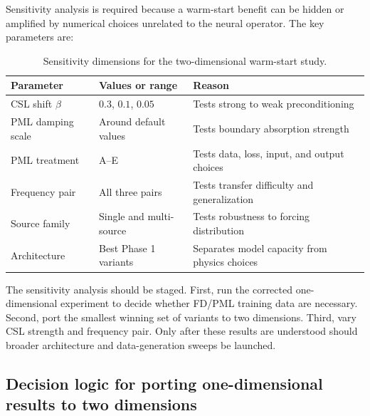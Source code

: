Sensitivity analysis is required because a warm-start benefit can be hidden or
amplified by numerical choices unrelated to the neural operator. The key
parameters are:
\begin{table}[h]
\centering
\begin{tabular}{lll}
\toprule
Parameter & Values or range & Reason \\
\midrule
CSL shift $\beta$ & $0.3$, $0.1$, $0.05$ & Tests strong to weak preconditioning \\
PML damping scale & Around default values & Tests boundary absorption strength \\
PML treatment & A--E & Tests data, loss, input, and output choices \\
Frequency pair & All three pairs & Tests transfer difficulty and generalization \\
Source family & Single and multi-source & Tests robustness to forcing distribution \\
Architecture & Best Phase 1 variants & Separates model capacity from physics choices \\
\bottomrule
\end{tabular}
\caption{Sensitivity dimensions for the two-dimensional warm-start study.}
\label{tab:twod_sensitivity}
\end{table}

The sensitivity analysis should be staged. First, run the corrected
one-dimensional experiment to decide whether FD/PML training data are
necessary. Second, port the smallest winning set of variants to two
dimensions. Third, vary CSL strength and frequency pair. Only after these
results are understood should broader architecture and data-generation sweeps
be launched.


\subsection{Decision logic for porting one-dimensional results to two dimensions}
\label{subsec:methodology_2d_decision_logic}

